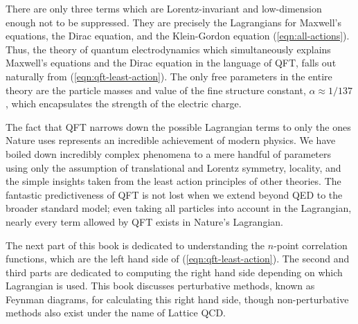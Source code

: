 There are only three terms which are Lorentz-invariant and low-dimension enough not to be suppressed. They are precisely the Lagrangians for Maxwell's equations, the Dirac equation, and the Klein-Gordon equation (\ref{eqn:all-actions}). Thus, the theory of quantum electrodynamics which simultaneously explains Maxwell's equations and the Dirac equation in the language of QFT, falls out naturally from (\ref{eqn:qft-least-action}). The only free parameters in the entire theory are the particle masses and value of the fine structure constant, $\alpha \approx 1/137$, which encapsulates the strength of the electric charge.

The fact that QFT narrows down the possible Lagrangian terms to only the ones Nature uses represents an incredible achievement of modern physics. We have boiled down incredibly complex phenomena to a mere handful of parameters using only the assumption of translational and Lorentz symmetry, locality, and the simple insights taken from the least action principles of other theories. The fantastic predictiveness of QFT is not lost when we extend beyond QED to the broader standard model; even taking all particles into account in the Lagrangian, nearly every term allowed by QFT exists in Nature's Lagrangian.

The next part of this book is dedicated to understanding the $n$-point correlation functions, which are the left hand side of (\ref{eqn:qft-least-action}). The second and third parts are dedicated to computing the right hand side depending on which Lagrangian is used. This book discusses perturbative methods, known as Feynman diagrams, for calculating this right hand side, though non-perturbative methods also exist under the name of Lattice QCD.

